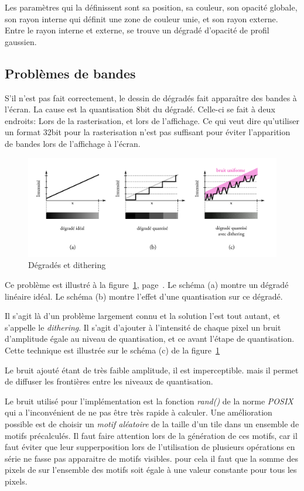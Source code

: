 	Les paramètres qui la définissent sont sa position, sa couleur, son opacité globale, 
	son rayon interne qui définit une zone de couleur unie, et son rayon externe. Entre le rayon interne
	et externe, se trouve un dégradé d'opacité de profil gaussien.

	\subsection{Problèmes de bandes}
		S'il n'est pas fait correctement, le dessin de dégradés fait apparaître des
		bandes à l'écran. La cause est la quantisation 8bit du dégradé. Celle-ci se
		fait à deux endroits: Lors de la rasterisation, et lors de l'affichage. Ce qui veut
		dire qu'utiliser un format 32bit pour la rasterisation n'est pas suffisant pour
		éviter l'apparition de bandes lors de l'affichage à l'écran. 

		\begin{figure}[ht]
			\centering
			\includegraphics[width=\textwidth]{images/degrades} 
			\caption{Dégradés et dithering}
			\label{fig:dithering}
		\end{figure}

		Ce problème est illustré à la figure~\ref{fig:dithering}, page~\pageref{fig:dithering}.
		Le schéma (a) montre un dégradé linéaire idéal. Le schéma (b) montre l'effet 
		d'une quantisation sur ce dégradé. 

		Il s'agit là d'un problème largement connu et la solution l'est tout autant,
		et s'appelle le \emph{dithering}. Il s'agit d'ajouter à l'intensité de chaque pixel
		un bruit d'amplitude égale au niveau de quantisation, et ce avant l'étape
		de quantisation. Cette technique est illustrée sur le schéma (c) de la figure~\ref{fig:dithering} 

		Le bruit ajouté étant de très faible amplitude, il est imperceptible. mais il permet de diffuser
		les frontières entre les niveaux de quantisation.

		Le bruit utilisé pour l'implémentation est la fonction \emph{rand()} de la norme
		\emph{POSIX} qui a l'inconvénient de ne pas être très rapide à calculer. Une amélioration possible est de
		choisir un \emph{motif aléatoire}  de la taille d'un tile dans un ensemble de motifs
		précalculés. Il faut faire attention lors de la génération de ces motifs, car il faut éviter
		que leur supperposition lors de l'utilisation de plusieurs opérations en série
		ne fasse pas apparaitre de motifs visibles. pour cela il faut que la somme des pixels de sur l'ensemble
		des motifs soit égale à une valeur constante pour tous les pixels. 

